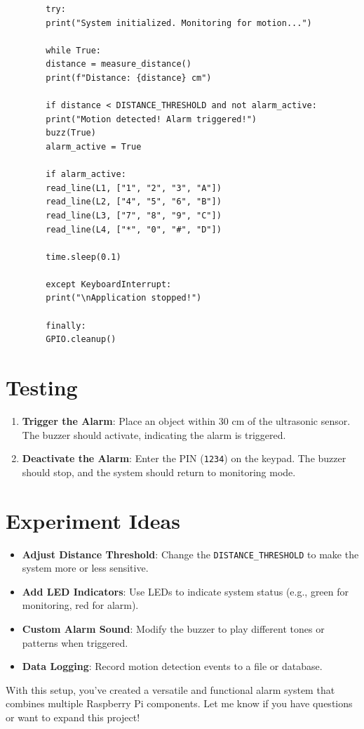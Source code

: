 \documentclass{article}
\begin{document}
	\begin{lstlisting}
		try:
		print("System initialized. Monitoring for motion...")
		
		while True:
		distance = measure_distance()
		print(f"Distance: {distance} cm")
		
		if distance < DISTANCE_THRESHOLD and not alarm_active:
		print("Motion detected! Alarm triggered!")
		buzz(True)
		alarm_active = True
		
		if alarm_active:
		read_line(L1, ["1", "2", "3", "A"])
		read_line(L2, ["4", "5", "6", "B"])
		read_line(L3, ["7", "8", "9", "C"])
		read_line(L4, ["*", "0", "#", "D"])
		
		time.sleep(0.1)
		
		except KeyboardInterrupt:
		print("\nApplication stopped!")
		
		finally:
		GPIO.cleanup()
	\end{lstlisting}
	
	\section*{Testing}
	\begin{enumerate}
		\item \textbf{Trigger the Alarm}: Place an object within 30 cm of the ultrasonic sensor. The buzzer should activate, indicating the alarm is triggered.
		\item \textbf{Deactivate the Alarm}: Enter the PIN (\texttt{1234}) on the keypad. The buzzer should stop, and the system should return to monitoring mode.
	\end{enumerate}
	
	\section*{Experiment Ideas}
	\begin{itemize}
		\item \textbf{Adjust Distance Threshold}: Change the \texttt{DISTANCE\_THRESHOLD} to make the system more or less sensitive.
		\item \textbf{Add LED Indicators}: Use LEDs to indicate system status (e.g., green for monitoring, red for alarm).
		\item \textbf{Custom Alarm Sound}: Modify the buzzer to play different tones or patterns when triggered.
		\item \textbf{Data Logging}: Record motion detection events to a file or database.
	\end{itemize}
	
	With this setup, you've created a versatile and functional alarm system that combines multiple Raspberry Pi components. Let me know if you have questions or want to expand this project!
	
\end{document}
